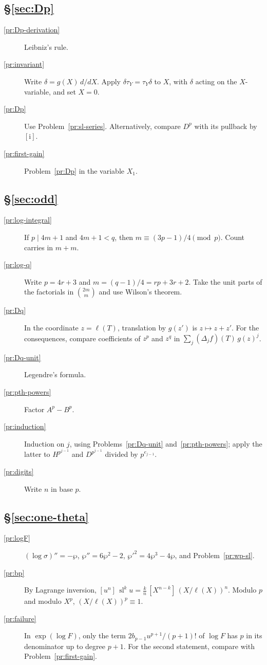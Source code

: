 \documentclass[reqno]{amsart}
\theoremstyle{definition}
\theoremstyle{plain}
\newcommand{\ii}{\mathrm{i}}
\newcommand{\sll}{\operatorname{sl}}
\begin{document}
\subsection*{\S\ref{sec:Dp}}
\begin{description}
\item[\ref{pr:Dp-derivation}] Leibniz's rule.
\item[\ref{pr:invariant}] Write \(\delta = g(X)\,d/dX\).  Apply \(\delta\tau_Y = \tau_Y\delta\) to \(X\), with \(\delta\) acting on the \(X\)-variable, and set \(X=0\).
\item[\ref{pr:Dp}] Use Problem~\ref{pr:sl-series}.  Alternatively, compare \(D^p\) with its pullback by \([\ii]\).
\item[\ref{pr:first-gain}] Problem~\ref{pr:Dp} in the variable \(X_1\).
\end{description}

\subsection*{\S\ref{sec:odd}}
\begin{description}
\item[\ref{pr:log-integral}] If \(p \mid 4m+1\) and \(4m + 1 < q\), then \(m \equiv (3p-1)/4 \pmod p\).  Count carries in \(m + m\).
\item[\ref{pr:log-q}] Write \(p = 4r + 3\) and \(m = (q-1)/4 = rp + 3r + 2\).  Take the unit parts of the factorials in \(\binom{2m}{m}\) and use Wilson's theorem.
\item[\ref{pr:Dq}] In the coordinate \(z = \ell(T)\), translation by \(g(z')\) is \(z \mapsto z + z'\).  For the consequences, compare coefficients of \(z^p\) and \(z^q\) in \(\sum_j (\Delta_j f)(T)\, g(z)^j\).
\item[\ref{pr:Dq-unit}] Legendre's formula.
\item[\ref{pr:pth-powers}] Factor \(A^p - B^p\).
\item[\ref{pr:induction}] Induction on \(j\), using Problems~\ref{pr:Dq-unit} and~\ref{pr:pth-powers}; apply the latter to \(H^{p^{j-1}}\) and \(D^{p^{j-1}}\) divided by \(p^{e_{j-1}}\).
\item[\ref{pr:digits}] Write \(n\) in base \(p\).
\end{description}

\subsection*{\S\ref{sec:one-theta}}
\begin{description}
\item[\ref{pr:logF}] \((\log\sigma)'' = -\wp\), \(\wp'' = 6\wp^2 - 2\), \(\wp'^2 = 4\wp^3 - 4\wp\), and Problem~\ref{pr:wp-sl}.
\item[\ref{pr:bp}] By Lagrange inversion, \([u^n]\, \sll^k u = \tfrac{k}{n}\, [X^{n-k}]\, (X/\ell(X))^n\).  Modulo \(p\) and modulo \(X^p\), \((X/\ell(X))^p \equiv 1\).
\item[\ref{pr:failure}] In \(\exp(\log F)\), only the term \(2b_{p-1}u^{p+1}/(p+1)!\) of \(\log F\) has \(p\) in its denominator up to degree \(p + 1\).  For the second statement, compare with Problem~\ref{pr:first-gain}.
\end{description}
\end{document}
